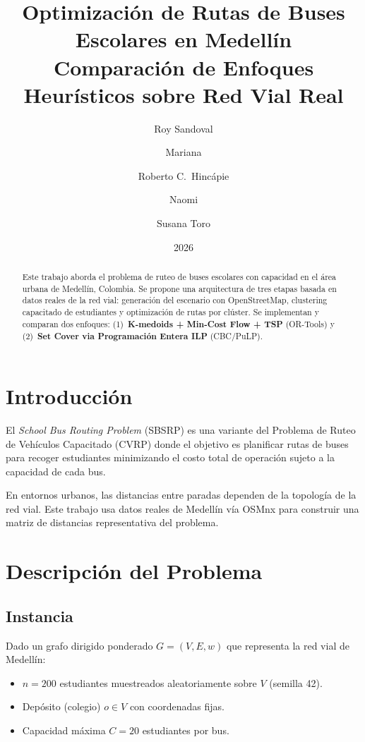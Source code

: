 \documentclass[12pt,a4paper]{article}
\title{\textbf{Optimizaci\'on de Rutas de Buses Escolares en Medell\'in}\\[6pt]
\large Comparaci\'on de Enfoques Heur\'isticos sobre Red Vial Real}
\author{Roy Sandoval \and Mariana \and Roberto C.\ Hinc\'apie \and Naomi \and Susana Toro}
\date{2026}
\begin{document}
\maketitle

\begin{abstract}
Este trabajo aborda el problema de ruteo de buses escolares con capacidad
en el \'area urbana de Medell\'in, Colombia.
Se propone una arquitectura de tres etapas basada en datos reales de la red vial:
generaci\'on del escenario con OpenStreetMap, clustering capacitado de estudiantes
y optimizaci\'on de rutas por cl\'uster.
Se implementan y comparan dos enfoques:
(1)~\textbf{K-medoids + Min-Cost Flow + TSP} (OR-Tools) y
(2)~\textbf{Set Cover via Programaci\'on Entera ILP} (CBC/PuLP).
\end{abstract}

\tableofcontents
\newpage

\section{Introducci\'on}

El \textit{School Bus Routing Problem} (SBSRP) es una variante del Problema
de Ruteo de Veh\'iculos Capacitado (CVRP) donde el objetivo es planificar
rutas de buses para recoger estudiantes minimizando el costo total de
operaci\'on sujeto a la capacidad de cada bus.

En entornos urbanos, las distancias entre paradas dependen de la topolog\'ia
de la red vial.  Este trabajo usa datos reales de Medell\'in v\'ia OSMnx
para construir una matriz de distancias representativa del problema.

\section{Descripci\'on del Problema}

\subsection{Instancia}

Dado un grafo dirigido ponderado $G=(V,E,w)$ que representa la red vial de Medell\'in:
\begin{itemize}
  \item $n=200$ estudiantes muestreados aleatoriamente sobre $V$ (semilla 42).
  \item Dep\'osito (colegio) $o\in V$ con coordenadas fijas.
  \item Capacidad m\'axima $C=20$ estudiantes por bus.
\end{itemize}
\end{document}
